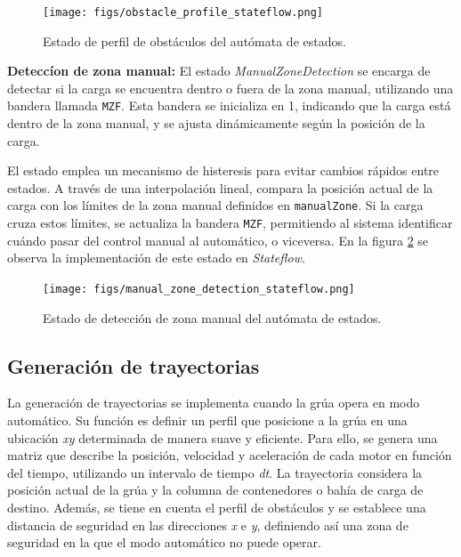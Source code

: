 \documentclass{article}
\begin{document}
            \begin{figure} [H]
                \centering
                \texttt{[image: figs/obstacle\_profile\_stateflow.png]}
                \caption{Estado de perfil de obstáculos del autómata de estados.}
                \label{fig:obstacle_profile_stateflow}
            \end{figure}

        \textbf{Deteccíon de zona manual:}
            El estado \textit{ManualZoneDetection} se encarga de detectar si la carga se encuentra dentro o fuera de la zona manual, utilizando una bandera llamada \texttt{MZF}. Esta bandera se inicializa en 1, indicando que la carga está dentro de la zona manual, y se ajusta dinámicamente según la posición de la carga.

            El estado emplea un mecanismo de histeresis para evitar cambios rápidos entre estados. A través de una interpolación lineal, compara la posición actual de la carga con los límites de la zona manual definidos en \texttt{manualZone}. Si la carga cruza estos límites, se actualiza la bandera \texttt{MZF}, permitiendo al sistema identificar cuándo pasar del control manual al automático, o viceversa. En la figura \ref{fig:manual_zone_detection_stateflow} se observa la implementación de este estado en \textit{Stateflow}.
        
            \begin{figure} [H]
                \centering
                \texttt{[image: figs/manual\_zone\_detection\_stateflow.png]}
                \caption{Estado de detección de zona manual del autómata de estados.}
                \label{fig:manual_zone_detection_stateflow}
            \end{figure}


    


        \subsection{Generación de trayectorias} \label{sec:gen_trayectorias}

            La generación de trayectorias se implementa cuando la grúa opera en modo automático. Su función es definir un perfil que posicione a la grúa en una ubicación \textit{xy} determinada de manera suave y eficiente. Para ello, se genera una matriz que describe la posición, velocidad y aceleración de cada motor en función del tiempo, utilizando un intervalo de tiempo \textit{dt}. La trayectoria considera la posición actual de la grúa y la columna de contenedores o bahía de carga de destino. Además, se tiene en cuenta el perfil de obstáculos y se establece una distancia de seguridad en las direcciones \textit{x} e \textit{y}, definiendo así una zona de seguridad en la que el modo automático no puede operar.
\end{document}
